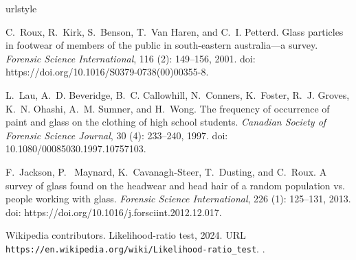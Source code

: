 \documentclass{article}\usepackage[]{graphicx}\usepackage[]{xcolor}
\begin{document}
\begin{thebibliography}{4}
\providecommand{\natexlab}[1]{#1}
\providecommand{\url}[1]{\texttt{#1}}
\expandafter\ifx\csname urlstyle\endcsname\relax
  \providecommand{\doi}[1]{doi: #1}\else
  \providecommand{\doi}{doi: \begingroup \urlstyle{rm}\Url}\fi

C.~Roux, R.~Kirk, S.~Benson, T.~{Van Haren}, and C.~I. Petterd.
\newblock Glass particles in footwear of members of the public in south-eastern
  australia---a survey.
\newblock \emph{Forensic Science International}, 116 (2):
  149--156, 2001.
\newblock \doi{https://doi.org/10.1016/S0379-0738(00)00355-8}.

L.~Lau, A.~D. Beveridge, B.~C. Callowhill, N.~Conners, K.~Foster, R.~J. Groves,
  K.~N. Ohashi, A.~M. Sumner, and H.~Wong.
\newblock The frequency of occurrence of paint and glass on the clothing of
  high school students.
\newblock \emph{Canadian Society of Forensic Science Journal}, 30
  (4): 233--240, 1997.
\newblock \doi{10.1080/00085030.1997.10757103}.

F.~Jackson, P.~{ Maynard}, K.~Cavanagh-Steer, T.~Dusting, and C.~Roux.
\newblock A survey of glass found on the headwear and head hair of a random
  population vs. people working with glass.
\newblock \emph{Forensic Science International}, 226 (1):
  125--131, 2013.
\newblock \doi{https://doi.org/10.1016/j.forsciint.2012.12.017}.

Wikipedia contributors.
\newblock Likelihood-ratio test, 2024.
\newblock URL \url{https://en.wikipedia.org/wiki/Likelihood-ratio_test}.
.

\end{thebibliography}
\end{document}
